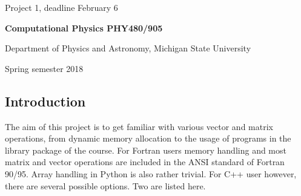 \documentclass[%
oneside,                 %
final,                   %
10pt]{article}
\begin{document}

\newcommand{\exercisesection}[1]{\subsection*{#1}}






\thispagestyle{empty}

\begin{center}
{\LARGE\bf
\begin{spacing}{1.25}
Project 1, deadline  February 6
\end{spacing}
}
\end{center}


\begin{center}
{\bf Computational Physics PHY480/905}
\end{center}

    \begin{center}
\centerline{{\small Department of Physics and Astronomy, Michigan State University}}
\end{center}
    

\begin{center}
Spring semester 2018
\end{center}

\vspace{1cm}


\subsection*{Introduction}
The aim of this project is to get familiar with various vector and matrix operations,
from dynamic memory allocation to the usage of programs in the library
package of the course. 
For Fortran users memory handling and most matrix and vector operations
are included in the ANSI standard of Fortran 90/95. Array handling in Python is also rather trivial. For C++ user however,
there are several possible options. Two are listed here.
\end{document}
